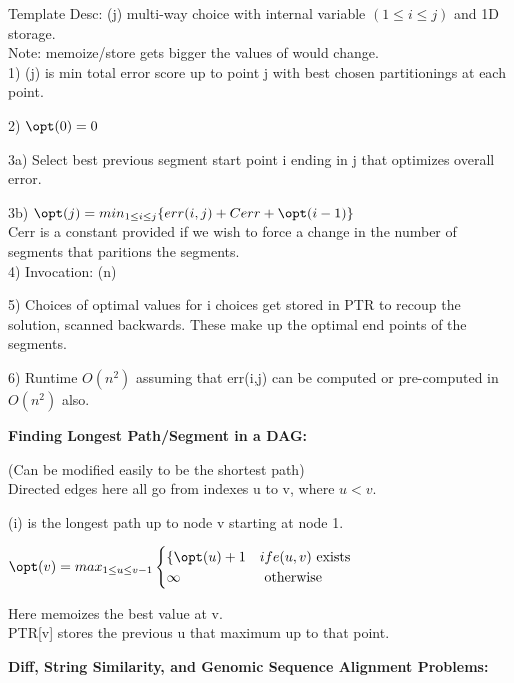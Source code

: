 Template Desc: \opt(j) multi-way choice with internal variable $(1\le i\le j)$ and 1D storage.\\
   Note: memoize/store \opt[j] gets bigger the values of \opt[j] would change.\\

  1) \opt(j) is min total error score up to point j with best chosen partitionings at each point.

  2) $\opt(0)=0$

  3a) Select best previous segment start point i ending in j that optimizes overall error.

  3b) $\opt(j)=\displaystyle min_{1\le i\le j}\{err(i,j) + Cerr + \opt(i-1)\}$\\

      Cerr is a constant provided if we wish to force a change in the number of segments
      that paritions the segments. \\

  4) Invocation: \opt(n)

  5) Choices of optimal values for i choices get stored in PTR to recoup the solution, 
scanned backwards.  These make up the optimal end points of the segments.

  6) Runtime $O(n^2)$ assuming that err(i,j) can be computed or pre-computed in $O(n^2)$ also.  

{\bf Finding Longest Path/Segment in a DAG:} 

(Can be modified easily to be the shortest path)\\

Directed edges here all go from indexes u to v, where $u<v$.

\opt(i) is the longest path up to node v starting at node 1.

$\opt(v)=\displaystyle max_{1\le u\le v-1}
\begin{cases}
        \{\opt(u) + 1    & if e(u,v) \text{ exists}\\
        \infty          & \text{ otherwise}
\end{cases}$

Here \opt[v] memoizes the best value at v. \\
PTR[v] stores the previous u that maximum up to that point.


{\bf Diff, String Similarity, and Genomic Sequence Alignment Problems:}

